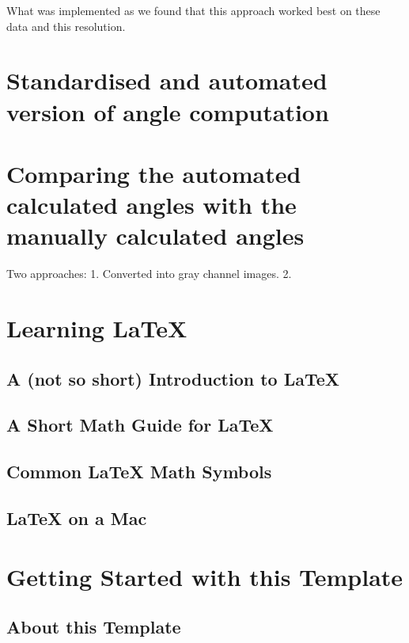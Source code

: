 What was implemented as we found that this approach worked best on these data and this resolution.


\section{Standardised and automated version of angle computation}


\section{Comparing the automated calculated angles with the manually calculated angles}


Two approaches:
1.
Converted into gray channel images.
2.


\section{Learning \LaTeX{}}


\subsection{A (not so short) Introduction to \LaTeX{}}


\subsection{A Short Math Guide for \LaTeX{}}


\subsection{Common \LaTeX{} Math Symbols}


\subsection{\LaTeX{} on a Mac}
 

\section{Getting Started with this Template}


\subsection{About this Template}


